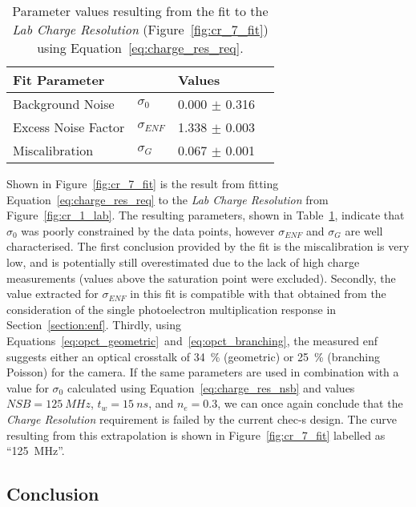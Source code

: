 \begin{table}[h]
\centering
\begin{tabular}{ll|ll} \toprule
    Fit Parameter        &                & Values             \\ \midrule
    Background Noise     & $\sigma_0$     & 0.000 $\pm$ 0.316  \\
    Excess Noise Factor  & $\sigma_{ENF}$ & 1.338 $\pm$ 0.003  \\
    Miscalibration       & $\sigma_G$     & 0.067 $\pm$ 0.001  \\ \bottomrule
\end{tabular}
\caption{Parameter values resulting from the fit to the \textit{Lab Charge Resolution} (Figure~\ref{fig:cr_7_fit}) using Equation~\ref{eq:charge_res_req}.}
\label{table:cr_7_fit}
\end{table}

Shown in Figure~\ref{fig:cr_7_fit} is the result from fitting Equation~\ref{eq:charge_res_req} to the \textit{Lab Charge Resolution} from Figure~\ref{fig:cr_1_lab}. The resulting parameters, shown in Table~\ref{table:cr_7_fit}, indicate that $\sigma_0$ was poorly constrained by the data points, however $\sigma_{ENF}$ and $\sigma_G$ are well characterised. The first conclusion provided by the fit is the miscalibration is very low, and is potentially still overestimated due to the lack of high charge measurements (values above the saturation point were excluded). Secondly, the value extracted for $\sigma_{ENF}$ in this fit is compatible with that obtained from the consideration of the single photoelectron multiplication response in Section~\ref{section:enf}. Thirdly, using Equations~\ref{eq:opct_geometric}~and~\ref{eq:opct_branching}, the measured \gls{enf} suggests either an optical crosstalk of \SI{34}{\percent} (geometric) or \SI{25}{\percent} (branching Poisson) for the camera. If the same parameters are used in combination with a value for $\sigma_0$ calculated using Equation~\ref{eq:charge_res_nsb} and values $\mathit{NSB} = \SI{125}{MHz}$, $t_w = \SI{15}{ns}$, and $n_e = 0.3$, we can once again conclude that the \textit{Charge Resolution} requirement is failed by the current \gls{chec-s} design. The curve resulting from this extrapolation is shown in Figure~\ref{fig:cr_7_fit} labelled as ``\SI{125}{MHz}''.

\subsection{Conclusion}

